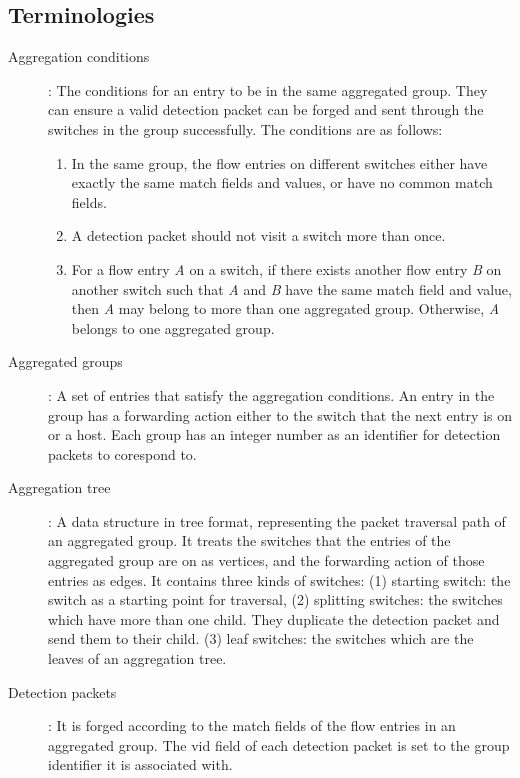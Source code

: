 \subsection{Terminologies}

\begin{description}%

\item
[Aggregation conditions]:
The conditions for an entry to be in the same aggregated group. They can ensure a valid detection packet can be forged and sent through the switches in the group successfully. The conditions are as follows:
\begin{enumerate}[label={\arabic*)}]
\item
In the same group, the flow entries on different switches either have exactly the same match fields and values, or have no common match fields.
\item
A detection packet should not visit a switch more than once.
\item
For a flow entry \textit{A} on a switch, if there exists another flow entry \textit{B} on another switch such that \textit{A} and \textit{B} have the same match field and value, then \textit{A} may belong to more than one aggregated group. Otherwise, \textit{A} belongs to one aggregated group.

\end{enumerate}

\item
[Aggregated groups]: 
A set of entries that satisfy the aggregation conditions. An entry in the group has a forwarding action either to the switch that the next entry is on or a host. Each group has an integer number as an identifier for detection packets to corespond to.

\item 
[Aggregation tree]:
A data structure in tree format, representing the packet traversal path of an aggregated group. It treats the switches that the entries of the aggregated group are on as vertices, and the forwarding action of those entries as edges. It contains three kinds of switches: (1) starting switch: the switch as a starting point for traversal, (2) splitting switches: the switches which have more than one child. They duplicate the detection packet and send them to their child. (3) leaf switches: the switches which are the leaves of an aggregation tree.

\item
[Detection packets]:
It is forged according to the match fields of the flow entries in an aggregated group. The vid field of each detection packet is set to the group identifier it is associated with.


\end{description}
